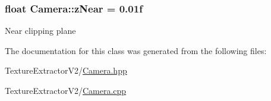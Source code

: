 \subsubsection[{z\+Near}]{\setlength{\rightskip}{0pt plus 5cm}float Camera\+::z\+Near = 0.\+01f}\label{class_camera_a1db2166635ff27594eda3a23130b66ac}
Near clipping plane 

The documentation for this class was generated from the following files\+:\begin{DoxyCompactItemize}
\item 
Texture\+Extractor\+V2/\hyperlink{_camera_8hpp}{Camera.\+hpp}\item 
Texture\+Extractor\+V2/\hyperlink{_camera_8cpp}{Camera.\+cpp}\end{DoxyCompactItemize}
